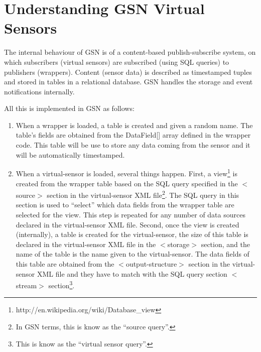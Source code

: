 
\section{Understanding GSN Virtual Sensors}

The internal behaviour of GSN is of a content-based publish-subscribe
system, on which subscribers (virtual sensors) are subscribed (using
SQL queries) to publishers (wrappers). Content (sensor data) is
described as timestamped tuples and stored in tables in a relational
database.  GSN handles the storage and event notifications internally.

All this is implemented in GSN as follows:

\begin{enumerate}
	\item When a wrapper is loaded, a table is created and given a random name.
The table's fields are obtained from the DataField[] array defined in
the wrapper code. This table will be use to store any data coming from
the sensor and it will be automatically timestamped.
	\item When a virtual-sensor is loaded, several things happen. First, a
view\footnote{http://en.wikipedia.org/wiki/Database\_view

} is created from the wrapper table based on the SQL query specified
in the \begin{math}<\end{math}source\begin{math}>\end{math} section in
the virtual-sensor XML file\footnote{ In GSN terms, this is know as the
\textquotedblleft{}source query\textquotedblright{}.

}.  The SQL query in this section is used to
\textquotedblleft{}select\textquotedblright{} which data fields from
the wrapper table are selected for the view. This step is repeated for
any number of data sources declared in the virtual-sensor XML file.
Second, once the view is created (internally), a table is created for
the virtual-sensor, the size of this table is declared in the
virtual-sensor XML file in the
\begin{math}<\end{math}storage\begin{math}>\end{math} section, and the
name of the table is the name given to the virtual-sensor. The data
fields of this table are obtained from the
\begin{math}<\end{math}output-structure\begin{math}>\end{math} section
in the virtual-sensor XML file and they have to match with the SQL
query section \begin{math}<\end{math}stream\begin{math}>\end{math}
section\footnote{This is know as the \textquotedblleft{}virtual sensor
query\textquotedblright{}.

}.
\end{enumerate}



